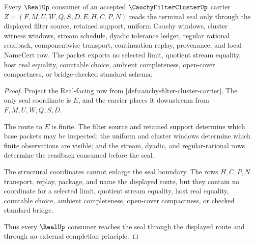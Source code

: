 \begin{theorem}\label{thm:cauchy-filter-cluster-real-seal-boundary}
Every $\RealUp$ consumer of an accepted $\CauchyFilterClusterUp$ carrier $Z=(F,M,U,W,Q,S,D,E,H,C,P,N)$ reads the terminal seal only through the displayed filter source, retained support, uniform Cauchy windows, cluster witness windows, stream schedule, dyadic tolerance ledger, regular rational readback, componentwise transport, continuation replay, provenance, and local NameCert row. The packet exports no selected limit, quotient stream equality, host real equality, countable choice, ambient completeness, open-cover compactness, or bridge-checked standard schema.
\end{theorem}
\begin{proof}
Project the Real-facing row from \autoref{def:cauchy-filter-cluster-carrier}. The only seal coordinate is $E$, and the carrier places it downstream from $F,M,U,W,Q,S,D$.

The route to $E$ is finite. The filter source and retained support determine which base packets may be inspected; the uniform and cluster windows determine which finite observations are visible; and the stream, dyadic, and regular-rational rows determine the readback consumed before the seal.

The structural coordinates cannot enlarge the seal boundary. The rows $H,C,P,N$ transport, replay, package, and name the displayed route, but they contain no coordinate for a selected limit, quotient stream equality, host real equality, countable choice, ambient completeness, open-cover compactness, or checked standard bridge.

Thus every $\RealUp$ consumer reaches the seal through the displayed route and through no external completion principle.
\end{proof}



